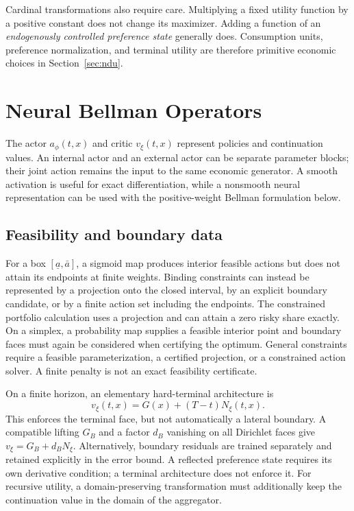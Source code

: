 \documentclass[ecta,draft]{econsocart}
\theoremstyle{definition}
\theoremstyle{remark}
\begin{document}
Cardinal transformations also require care. Multiplying a fixed utility function by a positive constant does not change its maximizer. Adding a function of an \emph{endogenously controlled preference state} generally does. Consumption units, preference normalization, and terminal utility are therefore primitive economic choices in Section~\ref{sec:ndu}.

\section{Neural Bellman Operators}\label{sec:method}
The actor $a_\phi(t,x)$ and critic $v_\xi(t,x)$ represent policies and continuation values. An internal actor and an external actor can be separate parameter blocks; their joint action remains the input to the same economic generator. A smooth activation is useful for exact differentiation, while a nonsmooth neural representation can be used with the positive-weight Bellman formulation below.

\subsection{Feasibility and boundary data}
For a box $[\underline a,\bar a]$, a sigmoid map produces interior feasible actions but does not attain its endpoints at finite weights. Binding constraints can instead be represented by a projection onto the closed interval, by an explicit boundary candidate, or by a finite action set including the endpoints. The constrained portfolio calculation uses a projection and can attain a zero risky share exactly. On a simplex, a probability map supplies a feasible interior point and boundary faces must again be considered when certifying the optimum. General constraints require a feasible parameterization, a certified projection, or a constrained action solver. A finite penalty is not an exact feasibility certificate.

On a finite horizon, an elementary hard-terminal architecture is
\begin{equation}\label{eq:terminal}
 v_\xi(t,x)=G(x)+(T-t)N_\xi(t,x).
\end{equation}
This enforces the terminal face, but not automatically a lateral boundary. A compatible lifting $G_B$ and a factor $d_B$ vanishing on all Dirichlet faces give $v_\xi=G_B+d_BN_\xi$. Alternatively, boundary residuals are trained separately and retained explicitly in the error bound. A reflected preference state requires its own derivative condition; a terminal architecture does not enforce it. For recursive utility, a domain-preserving transformation must additionally keep the continuation value in the domain of the aggregator.
\end{document}
